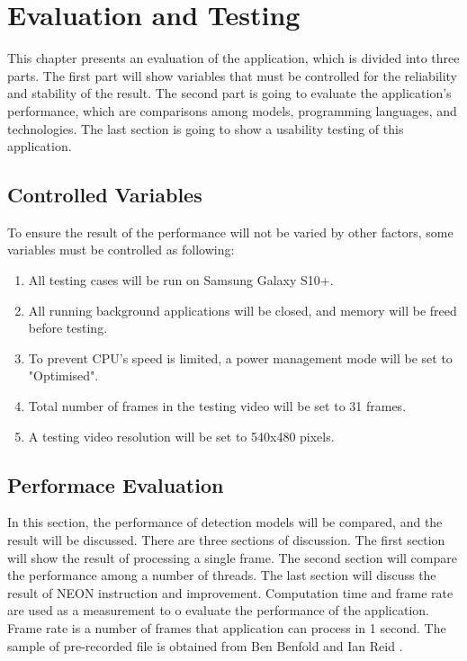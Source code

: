 \chapter{Evaluation and Testing}\label{testing}

    This chapter presents an evaluation of the application, which is divided into three parts.
    The first part will show variables that must be controlled for the reliability and stability of the result.
    The second part is going to evaluate the application's performance,
    which are comparisons among models, programming languages, and technologies.
    The last section is going to show a usability testing of this application.

    \section{Controlled Variables}
        To ensure the result of the performance will not be varied by other factors, some variables must be controlled as following:
        \begin{enumerate}
            \item All testing cases will be run on Samsung Galaxy S10+.
            \item All running background applications will be closed, and memory will be freed before testing.
            \item To prevent CPU's speed is limited, a power management mode will be set to "Optimised".
            \item Total number of frames in the testing video will be set to 31 frames.
            \item A testing video resolution will be set to 540x480 pixels.
        \end{enumerate}

    \section{Performace Evaluation}
        In this section, the performance of detection models will be compared, and the result will be discussed.
        There are three sections of discussion. The first section will show the result of processing a single frame.
        The second section will compare the performance among a number of threads.
        The last section will discuss the result of NEON instruction and improvement.
        Computation time and frame rate are used as a measurement to o evaluate the performance of the application.
        Frame rate is a number of frames that application can process in 1 second.
        The sample of pre-recorded file is obtained from Ben Benfold and Ian Reid \cite{benfold2009attention}.

